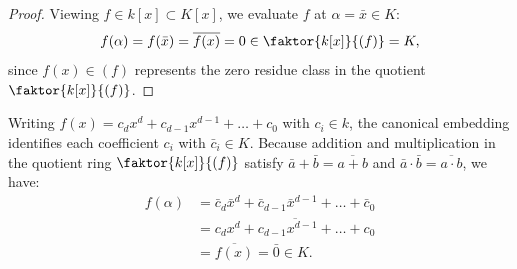 \begin{content}[Verification that \texorpdfstring{$f(\alpha) = 0$}{f(alpha) = 0} in \texorpdfstring{$K$}{K}]

\begin{proof}
Viewing $f \in k[x] \subset K[x]$, we evaluate $f$ at $\alpha = \bar{x} \in K$:
\[
f(\alpha) = f(\bar{x}) = \overline{f(x)} = 0 \in \faktor{k[x]}{(f)} = K,
\]
since $f(x) \in (f)$ represents the zero residue class in the quotient $\faktor{k[x]}{(f)}$.
\end{proof}

\begin{steps}
Writing $f(x) = c_d x^d + c_{d-1} x^{d-1} + \dots + c_0$ with $c_i \in k$, the canonical embedding identifies each coefficient $c_i$ with $\bar{c}_i \in K$. Because addition and multiplication in the quotient ring $\faktor{k[x]}{(f)}$ satisfy $\bar{a} + \bar{b} = \overline{a + b}$ and $\bar{a} \cdot \bar{b} = \overline{a \cdot b}$, we have:
\begin{align*}
f(\alpha) &= \bar{c}_d \bar{x}^d + \bar{c}_{d-1} \bar{x}^{d-1} + \dots + \bar{c}_0 \\
&= \overline{c_d x^d + c_{d-1} x^{d-1} + \dots + c_0} \\
&= \overline{f(x)} = \bar{0} \in K.
\end{align*}
\end{steps}
\end{content}

